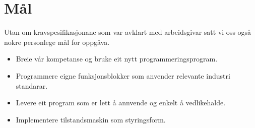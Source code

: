


\section{Mål}
Utan om kravspesifikasjonane som var avklart med arbeidsgivar satt vi oss
også nokre personlege mål for oppgåva.

\begin{itemize}
    \item Breie vår kompetanse og bruke eit nytt programmeringsprogram.
    \item Programmere eigne funksjonsblokker som anvender relevante industri standarar.
    \item Levere eit program som er lett å annvende og enkelt å vedlikehalde.
    \item Implementere tilstandsmaskin som styringsform.
\end{itemize}

